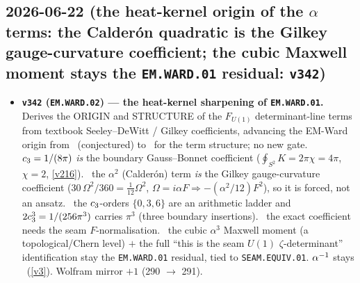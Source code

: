 \subsection*{2026-06-22 (the heat-kernel origin of the $\alpha$ terms: the Calder\'on quadratic is the Gilkey gauge-curvature coefficient; the cubic Maxwell moment stays the \texttt{EM.WARD.01} residual: \texttt{v342})}
\begin{itemize}
\item \textbf{\texttt{v342} (\texttt{EM.WARD.02}) --- the heat-kernel sharpening of \texttt{EM.WARD.01}.} Derives the
ORIGIN and STRUCTURE of the $F_{U(1)}$ determinant-line terms from textbook Seeley--DeWitt / Gilkey coefficients,
advancing the EM-Ward origin from \mC\ (conjectured) to \mE\ for the term structure; no new gate. \mE\ $c_3=
1/(8\pi)$ \emph{is} the boundary Gauss--Bonnet coefficient ($\oint_{S^2}K=2\pi\chi=4\pi$, $\chi{=}2$, \vref{v216}).
\mE\ the $\alpha^2$ (Calder\'on) term \emph{is} the Gilkey gauge-curvature coefficient ($30\,\Omega^2/360=\tfrac1{12}
\Omega^2$, $\Omega{=}i\alpha F\Rightarrow-(\alpha^2/12)F^2$), so it is forced, not an ansatz. \mE\ the $c_3$-orders
$\{0,3,6\}$ are an arithmetic ladder and $2c_3^3=1/(256\pi^3)$ carries $\pi^3$ (three boundary insertions). \mC\
the exact coefficient needs the seam $F$-normalisation. \mO\ the cubic $\alpha^3$ Maxwell moment (a topological/Chern
level) $+$ the full ``this is the seam $U(1)$ $\zeta$-determinant'' identification stay the \texttt{EM.WARD.01}
residual, tied to \texttt{SEAM.EQUIV.01}. $\alpha^{-1}$ stays \mE\ (\vref{v3}). Wolfram mirror $+1$ (290 $\to$ 291).
\end{itemize}

